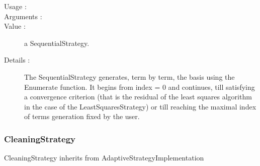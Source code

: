 \begin{description}
\item[Usage :] \rule{0pt}{1em}

\item[Arguments :]  \rule{0pt}{1em}

\item[Value :] a SequentialStrategy.

\item[Details :] The SequentialStrategy  generates, term by term, the basis using the Enumerate function. It begins from index = 0 and continues, till satisfying a convergence criterion (that is the residual of the least squares algorithm in the case of the LeastSquaresStrategy) or till reaching the maximal index of terms generation fixed by the user.
\end{description}





\newpage      \subsubsection{CleaningStrategy}

CleaningStrategy inherits from AdaptiveStrategyImplementation

